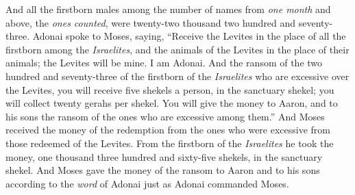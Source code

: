 \begin{biblechapter}
\verse And all the firstborn males among the number of names from \textit{one month} and above, the \textit{ones counted}, were twenty-two thousand two hundred and seventy-three.
\verse Adonai spoke to Moses, saying,
\verse “Receive the Levites in the place of all the firstborn among the \textit{Israelites}, and the animals of the Levites in the place of their animals; the Levites will be mine. I am Adonai.
\verse And the ransom of the two hundred and seventy-three of the firstborn of the \textit{Israelites} who are excessive over the Levites,
\verse you will receive five shekels a person, in the sanctuary shekel; you will collect twenty gerahs per shekel.
\verse You will give the money to Aaron, and to his sons the ransom of the ones who are excessive among them.”
\verse And Moses received the money of the redemption from the ones who were excessive from those redeemed of the Levites.
\verse From the firstborn of the \textit{Israelites} he took the money, one thousand three hundred and sixty-five shekels, in the sanctuary shekel.
\verse And Moses gave the money of the ransom to Aaron and to his sons according to the \textit{word} of Adonai just as Adonai commanded Moses.
\end{biblechapter}

